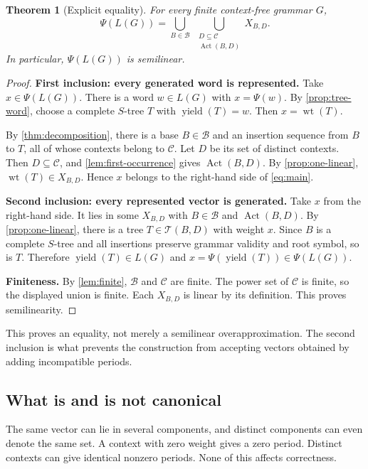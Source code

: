 \documentclass[11pt,a4paper]{article}
\numberwithin{equation}{section}
\theoremstyle{plain}
\newtheorem{theorem}{Theorem}[section]
\theoremstyle{definition}
\theoremstyle{remark}
\newcommand{\wt}{\operatorname{wt}}
\newcommand{\yield}{\operatorname{yield}}
\newcommand{\Act}{\operatorname{Act}}
\newcommand{\Trees}{\mathcal T}
\newcommand{\Bases}{\mathcal B}
\newcommand{\Cycles}{\mathcal C}
\begin{document}
\begin{theorem}[Explicit equality]\label{thm:main}
For every finite context-free grammar $G$,
\begin{equation}\label{eq:main}
\boxed{\displaystyle
\Psi(L(G))=
\bigcup_{B\in\Bases}\;
\bigcup_{\substack{D\subseteq\Cycles\\\Act(B,D)}}
X_{B,D}.}
\end{equation}
In particular, $\Psi(L(G))$ is semilinear.
\end{theorem}
\begin{proof}
\textbf{First inclusion: every generated word is represented.}
Take $x\in\Psi(L(G))$. There is a word $w\in L(G)$ with $x=\Psi(w)$. By \cref{prop:tree-word}, choose a complete $S$-tree $T$ with $\yield(T)=w$. Then $x=\wt(T)$.

By \cref{thm:decomposition}, there is a base $B\in\Bases$ and an insertion sequence from $B$ to $T$, all of whose contexts belong to $\Cycles$. Let $D$ be its set of distinct contexts. Then $D\subseteq\Cycles$, and \cref{lem:first-occurrence} gives $\Act(B,D)$. By \cref{prop:one-linear}, $\wt(T)\in X_{B,D}$. Hence $x$ belongs to the right-hand side of \eqref{eq:main}.

\textbf{Second inclusion: every represented vector is generated.}
Take $x$ from the right-hand side. It lies in some $X_{B,D}$ with $B\in\Bases$ and $\Act(B,D)$. By \cref{prop:one-linear}, there is a tree $T\in\Trees(B,D)$ with weight $x$. Since $B$ is a complete $S$-tree and all insertions preserve grammar validity and root symbol, so is $T$. Therefore $\yield(T)\in L(G)$ and $x=\Psi(\yield(T))\in\Psi(L(G))$.

\textbf{Finiteness.}
By \cref{lem:finite}, $\Bases$ and $\Cycles$ are finite. The power set of $\Cycles$ is finite, so the displayed union is finite. Each $X_{B,D}$ is linear by its definition. This proves semilinearity.
\end{proof}

This proves an equality, not merely a semilinear overapproximation. The second inclusion is what prevents the construction from accepting vectors obtained by adding incompatible periods.

\subsection{What is and is not canonical}
The same vector can lie in several components, and distinct components can even denote the same set. A context with zero weight gives a zero period. Distinct contexts can give identical nonzero periods. None of this affects correctness.
\end{document}
